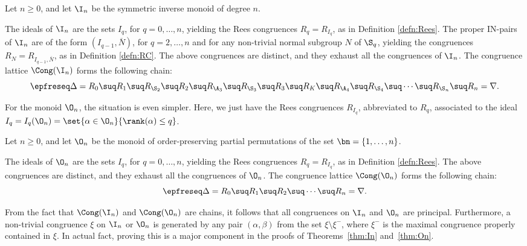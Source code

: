 \begin{thm}\label{thm:In}
Let $n\geq0$, and let $\I_n$ be the symmetric inverse monoid of degree $n$.  
\begin{itemize}
 The ideals of $\I_n$ are the sets $I_q$, for $q=0,\ldots,n$, yielding the Rees congruences $R_q=R_{I_q}$, as in Definition \ref{defn:Rees}.
 The proper IN-pairs of $\I_n$ are of the form $(I_{q-1},\overline N)$, for $q=2,\ldots,n$ and for any non-trivial normal subgroup $N$ of $\S_q$, yielding the congruences $R_N=R_{I_{q-1},\overline N}$, as in Definition \ref{defn:RC}.
 The above congruences are distinct, and they exhaust all the congruences of $\I_n$.
 The congruence lattice $\Cong(\I_n)$ forms the following chain:
\[
\epfreseq
\Delta=R_0 \suq R_1 \suq R_{\S_2} \suq R_2 \suq R_{\A_3} \suq R_{\S_3} \suq R_3 \suq R_K \suq R_{\A_4} \suq R_{\S_4}  \suq \cdots \suq R_{\S_n}\suq R_n = \nabla.
\]
\end{itemize}
\end{thm}



For the monoid $\O_n$, the situation is even simpler.  Here, we just have the Rees congruences $R_{I_q}$, abbreviated to $R_q$, associated to the ideal $I_q=I_q(\O_n)=\set{\alpha\in\O_n}{\rank(\alpha)\leq q}$. 



\begin{thm}
\label{thm:On}
Let $n\geq0$, and let $\O_n$ be the monoid of order-preserving partial permutations of the set $\bn=\{1,\ldots,n\}$.  
\begin{itemize}
 The ideals of $\O_n$ are the sets $I_q$, for $q=0,\ldots,n$, yielding the Rees congruences $R_q=R_{I_q}$, as in Definition \ref{defn:Rees}.
 The above congruences are distinct, and they exhaust all the congruences of $\O_n$.
 The congruence lattice $\Cong(\O_n)$ forms the following chain:
\[
\epfreseq
\Delta = R_0 \suq R_1 \suq R_2 \suq\cdots\suq R_n = \nabla.
\]
\end{itemize}
\end{thm}


\begin{rem}
\label{rem:InOnPrinc}
  From the fact that $\Cong(\I_n)$ and $\Cong(\O_n)$ are chains, it follows
  that all congruences on $\I_n$ and $\O_n$ are principal.  Furthermore, a non-trivial
  congruence $\xi$ on $\I_n$ or $\O_n$ is generated by any pair $(\alpha,\beta)$ from the set
  $\xi\setminus\xi^-$, where $\xi^-$ is the maximal congruence properly contained in
  $\xi$.  In actual fact, proving this is a major component in the proofs of
  Theorems~\ref{thm:In} and~\ref{thm:On}.
\end{rem}




